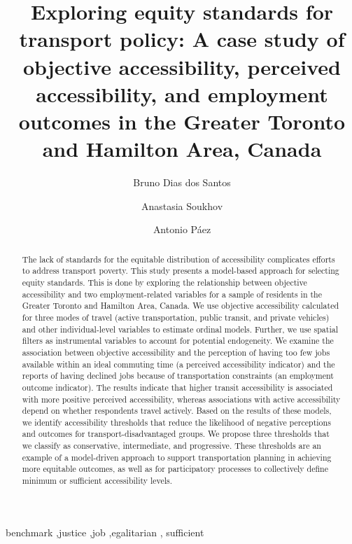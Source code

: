 \documentclass[preprint, 3p,
authoryear]{elsarticle} %
\begin{document}
\begin{frontmatter}

  \title{Exploring equity standards for transport policy: A case study
of objective accessibility, perceived accessibility, and employment
outcomes in the Greater Toronto and Hamilton Area, Canada}
    \author[McMaster University]{Bruno Dias dos Santos%
  }
    \author[Western University]{Anastasia Soukhov%
  }
    \author[McMaster University]{Antonio Páez%
  }
  
  \begin{abstract}
  The lack of standards for the equitable distribution of accessibility
  complicates efforts to address transport poverty. This study presents
  a model-based approach for selecting equity standards. This is done by
  exploring the relationship between objective accessibility and two
  employment-related variables for a sample of residents in the Greater
  Toronto and Hamilton Area, Canada. We use objective accessibility
  calculated for three modes of travel (active transportation, public
  transit, and private vehicles) and other individual-level variables to
  estimate ordinal models. Further, we use spatial filters as
  instrumental variables to account for potential endogeneity. We
  examine the association between objective accessibility and the
  perception of having too few jobs available within an ideal commuting
  time (a perceived accessibility indicator) and the reports of having
  declined jobs because of transportation constraints (an employment
  outcome indicator). The results indicate that higher transit
  accessibility is associated with more positive perceived
  accessibility, whereas associations with active accessibility depend
  on whether respondents travel actively. Based on the results of these
  models, we identify accessibility thresholds that reduce the
  likelihood of negative perceptions and outcomes for
  transport-disadvantaged groups. We propose three thresholds that we
  classify as conservative, intermediate, and progressive. These
  thresholds are an example of a model-driven approach to support
  transportation planning in achieving more equitable outcomes, as well
  as for participatory processes to collectively define minimum or
  sufficient accessibility levels.
  \end{abstract}
    \begin{keyword}
    benchmark \sep justice \sep job \sep egalitarian \sep 
    sufficient
  \end{keyword}
  
 \end{frontmatter}
\end{document}
